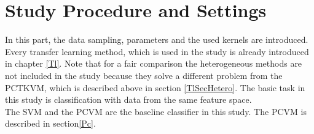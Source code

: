 \section{Study Procedure and Settings}\label{EmSecStudy}
In this part, the data sampling, parameters and the used kernels are introduced.
Every transfer learning method, which is used in the study is already introduced in chapter \ref{Tl}.
Note that for a fair comparison the heterogeneous methods are not included in the study because they solve a different problem from the \acs{PCTKVM}, which is described above in section \ref{TlSecHetero}.
The basic task in this study is classification with data from the same feature space.\\
The \ac{SVM} and the \acl{PCVM} are the baseline classifier in this study.
The \acs{PCVM} is described in section\ref{Pc}.\\

